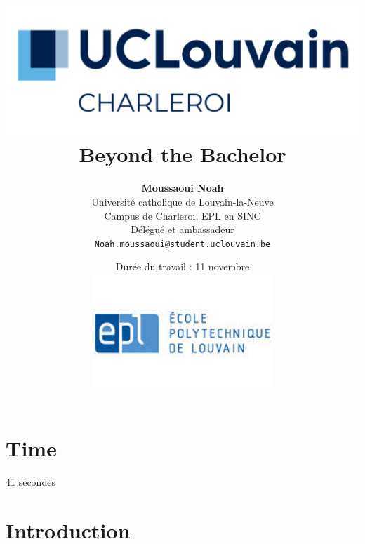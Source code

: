 \documentclass{article}
\begin{document}
\title{
    \includegraphics[width=1\textwidth]{photo/UCLouvain_Charleroi.png} \\
    \vspace{1.5cm}
    {\Huge \textbf{Beyond the Bachelor }} \\
    \vspace{1.5cm}
}

\author{
    \textbf{Moussaoui Noah} \\
    Université catholique de Louvain-la-Neuve \\
    Campus de Charleroi, EPL en SINC \\
    Délégué et ambassadeur \\
    \texttt{Noah.moussaoui@student.uclouvain.be}
}

\date{
    \vspace{1.5cm}
    Durée du travail : 11 novembre \\
    \vspace{1.5cm}
    \includegraphics[width=0.5\textwidth]{photo/EPL.jpeg}
}

\maketitle

\section{Time}
    41 secondes 
    
\section{Introduction}
\end{document}
